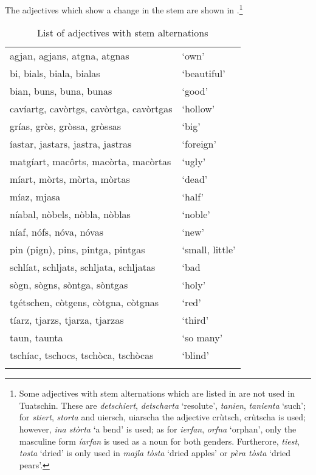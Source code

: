 {The adjectives which show a change in the stem are shown in .\footnote{Some adjectives with stem alternations which are listed in \citet{Spescha1989} are not used in Tuatschin. These are \textit{detschiert}, \textit{detscharta} `resolute', \textit{tanien}, \textit{tanienta} `such'; for \textit{stiert}, \textit{storta} and uiersch, uiarscha the adjective crùtsch, crùtscha is used; however, \textit{ina stòrta} `a bend' is used; as for \textit{ierfan}, \textit{orfna} `orphan', only the masculine form \textit{íarfan} is used as a noun for both genders. Furtherore, \textit{tiest}, \textit{tosta} `dried' is only used in \textit{majla tòsta} `dried apples' or \textit{pèra tòsta} `dried pears'.}



\begin{table}
\caption{List of adjectives with stem alternations}
\label{tab:list:adj:stemalternations}
 \begin{tabular}{ll} %
  \lsptoprule
  \midrule
 agjan, agjans, atgna, atgnas &`own'\\
bi, bials, biala, bialas &`beautiful'\\
bian, buns, buna, bunas &  `good'\\
cavíartg, cavòrtgs, cavòrtga, cavòrtgas& `hollow'\\
grías, gròs, gròssa, gròssas &`big'\\
íastar, jastars, jastra, jastras& `foreign'\\
matgíart, macôrts, macòrta, macòrtas &`ugly'\\
míart, mòrts, mòrta, mòrtas &`dead'\\
míaz, mjasa & `half'\\
níabal, nòbels, nòbla, nòblas & `noble'\\
níaf, nófs, nóva, nóvas &`new'\\ %
pin (pign), pins, pintga, pintgas &`small, little’\\
schlíat, schljats, schljata, schljatas& `bad\\ 
sògn, sògns, sòntga, sòntgas &`holy'\\
tgétschen, còtgens, còtgna, còtgnas& `red'\\
tíarz, tjarzs, tjarza, tjarzas &`third'\\
taun, taunta & `so many'\\
tschíac, tschocs, tschòca, tschòcas &`blind'\\
  \lspbottomrule
 \end{tabular}
\end{table}


}
